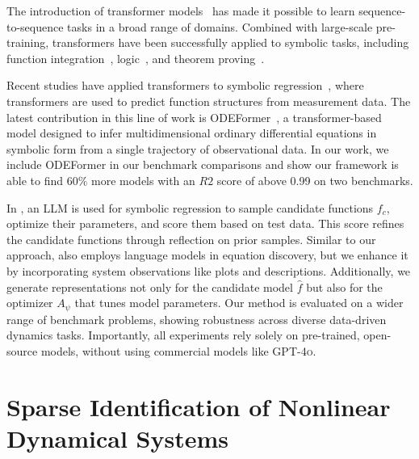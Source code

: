 \documentclass{article}
\begin{document}
The introduction of transformer models~\cite{Vaswani17} has made it possible to learn sequence-to-sequence tasks in a broad range of domains. 
Combined with large-scale pre-training, transformers have been successfully applied to symbolic tasks, including 
function integration~\cite{Lample2020Deep}, 
logic~\cite{hahn2021teaching}, and theorem proving~\cite{polu2020}.

Recent studies have applied transformers to symbolic regression~\cite{kamienny2022endtoend, Landajuela22, Vastl24}, where transformers are used to predict function structures from measurement data. 
The latest contribution in this line of work is ODEFormer~\cite{ascoli2024odeformer}, a transformer-based model designed to infer multidimensional ordinary differential equations in symbolic form from a single trajectory of observational data. 
In our work, we include ODEFormer in our benchmark comparisons and show our framework is able to find $60\%$ more models with an $R2$ score of above 0.99 on two benchmarks.

In \cite{Mengge24}, an LLM is used for symbolic regression to sample candidate functions $f_c$, optimize their parameters, and score them based on test data. 
This score refines the candidate functions through reflection on prior samples. 
Similar to our approach, \cite{Mengge24} also employs language models in equation discovery, but we enhance it by incorporating system observations like plots and descriptions. 
Additionally, we generate representations not only for the candidate model $\widehat{f}$ but also for the optimizer $A_\psi$ that tunes model parameters. 
Our method is evaluated on a wider range of benchmark problems, showing robustness across diverse data-driven dynamics tasks. 
Importantly, all experiments rely solely on pre-trained, open-source models, without using commercial models like \textsc{GPT-4o}.

\section{Sparse Identification of Nonlinear Dynamical Systems}
\end{document}
